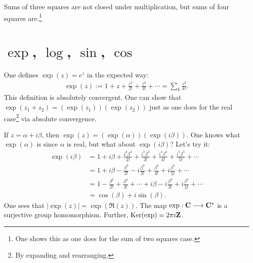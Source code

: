 \documentclass[11pt, oneside,margin=1in]{article}
\begin{document}
Sums of three squares are not closed under multiplication, but sums of four squares are.\footnote{One shows this as one does for the sum of two squares case.}

\section{\texorpdfstring{$\exp$}{exp}, \texorpdfstring{$\log$}{log}, \texorpdfstring{$\sin$}{sin}, \texorpdfstring{$\cos$}{cos}}
One defines $\exp (z) = e^z$ in the expected way: 
\begin{align*}
	\exp (z) := 1 + z + \frac{z^2}{2!} + \frac{z^3}{3!}+\cdots = \sum_{k}^{} \frac{z^k}{k!} .
\end{align*}
This definition is absolutely convergent. One can show that $\exp (z_1 + z_2) =(\exp (z_1)) (\exp (z_2))$ just as one does for the real case\footnote{By expanding and rearranging.} via absolute convergence.

If $z= \alpha+i\beta$, then $\exp (z) = (\exp (\alpha)) (\exp (i\beta))$. One knows what $\exp (\alpha)$ is since $\alpha$ is real, but what about $\exp (i\beta)$? Let's try it:
\begin{align*}
	\exp (i\beta) &= 1 + i\beta + \frac{i^2\beta^2}{2!} + \frac{i^3\beta^3}{3!} + \frac{i^4\beta^4}{4!} + \frac{i^5\beta^5}{5!} + \cdots\\
		    &= 1 + i\beta - \frac{\beta^2}{2!} - i \frac{\beta^3}{3!} + \frac{\beta^4}{4!} + i \frac{\beta^5}{5!} + \cdots\\
		    &= 1 - \frac{\beta^2}{2!} + \frac{\beta^4}{4!} +\cdots + i\beta - i \frac{\beta^3}{3!} + i\frac{\beta^5}{5!} + \cdots\\
		    &= \cos (\beta) + i \sin (\beta).
\end{align*}
One sees that $\left\lvert \exp (z) \right\rvert = \exp (\Re (z))$. The map $\exp : \mathbf C \longrightarrow \mathbf C^*$ is a surjective group homomorphism. Further, $\operatorname{Ker}(\exp) = 2\pi i\mathbf Z$.
\end{document}
